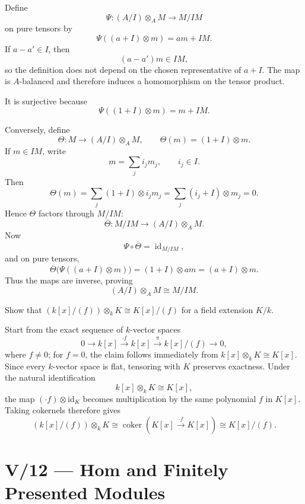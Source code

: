 \begin{solution}
Define
\[
\Psi:(A/I)\otimes_A M\longrightarrow M/IM
\]
on pure tensors by
\[
\Psi((a+I)\otimes m)=am+IM.
\]
If \(a-a'\in I\), then
\[
(a-a')m\in IM,
\]
so the definition does not depend on the chosen representative of \(a+I\).
The map is \(A\)-balanced and therefore induces a homomorphism on the tensor
product.

It is surjective because
\[
\Psi((1+I)\otimes m)=m+IM.
\]

Conversely, define
\[
\Theta:M\longrightarrow (A/I)\otimes_A M,
\qquad
\Theta(m)=(1+I)\otimes m.
\]
If \(m\in IM\), write
\[
m=\sum_j i_jm_j,\qquad i_j\in I.
\]
Then
\[
\Theta(m)
=
\sum_j (1+I)\otimes i_jm_j
=
\sum_j(i_j+I)\otimes m_j
=
0.
\]
Hence \(\Theta\) factors through \(M/IM\):
\[
\overline\Theta:M/IM\longrightarrow(A/I)\otimes_A M.
\]
Now
\[
\Psi\circ\overline\Theta=\operatorname{id}_{M/IM},
\]
and on pure tensors,
\[
\overline\Theta\bigl(\Psi((a+I)\otimes m)\bigr)
=
(1+I)\otimes am
=
(a+I)\otimes m.
\]
Thus the maps are inverse, proving
\[
(A/I)\otimes_A M\cong M/IM.
\]
\end{solution}


\begin{problem}[CP-V-0096]
\label{prob:cp-v-0096}
Show that \((k[x]/(f))\otimes_k K\cong K[x]/(f)\) for a field extension \(K/k\).
\end{problem}

\begin{solution}
Start from the exact sequence of \(k\)-vector spaces
\[
0\longrightarrow k[x]\xrightarrow{\cdot f}k[x]
\xrightarrow{\pi}k[x]/(f)\longrightarrow0,
\]
where \(f\ne0\); for \(f=0\), the claim follows immediately from
\(k[x]\otimes_k K\cong K[x]\).
Since every \(k\)-vector space is flat, tensoring with \(K\) preserves
exactness. Under the natural identification
\[
k[x]\otimes_k K\cong K[x],
\]
the map \((\cdot f)\otimes\mathrm{id}_K\) becomes multiplication by the
same polynomial \(f\) in \(K[x]\). Taking cokernels therefore gives
\[
(k[x]/(f))\otimes_k K
\cong\operatorname{coker}(K[x]\xrightarrow{\cdot f}K[x])
\cong K[x]/(f).
\]
\end{solution}



\section*{V/12 --- Hom and Finitely Presented Modules}

